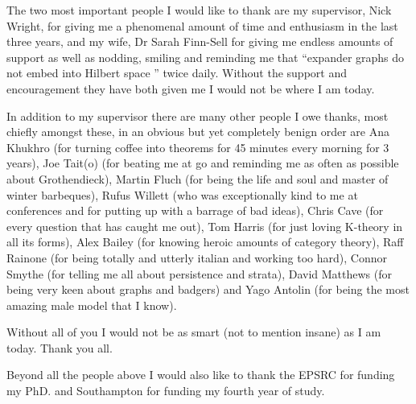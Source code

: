 \documentclass[11pt,a4paper,openright]{amsbook}
\theoremstyle{plain}
\theoremstyle{definition}%
\theoremstyle{remark}%
\begin{document}
The two most important people I would like to thank are my supervisor, Nick Wright, for giving me a phenomenal amount of time and enthusiasm in the last three years, and my wife, Dr Sarah Finn-Sell for giving me endless amounts of support as well as nodding, smiling and reminding me that ``expander graphs do not embed into Hilbert space '' twice daily.  Without the support and encouragement they have both given me I would not be where I am today.

In addition to my supervisor there are many other people I owe thanks, most chiefly amongst these, in an obvious but yet completely benign order are Ana Khukhro (for turning coffee into theorems for 45 minutes every morning for 3 years), Joe Tait(o) (for beating me at go and reminding me as often as possible about Grothendieck), Martin Fluch (for being the life and soul and master of winter barbeques), Rufus Willett (who was exceptionally kind to me at conferences and for putting up with a barrage of bad ideas), Chris Cave (for every question that has caught me out), Tom Harris (for just loving K-theory in all its forms), Alex Bailey (for knowing heroic amounts of category theory), Raff Rainone (for being totally and utterly italian and working too hard), Connor Smythe (for telling me all about persistence and strata), David Matthews (for being very keen about graphs and badgers) and Yago Antolin (for being the most amazing male model that I know).

Without all of you I would not be as smart (not to mention insane) as I am today. Thank you all.

Beyond all the people above I would also like to thank the EPSRC for funding my PhD. and Southampton for funding my fourth year of study.


\mainmatter







\end{document}
